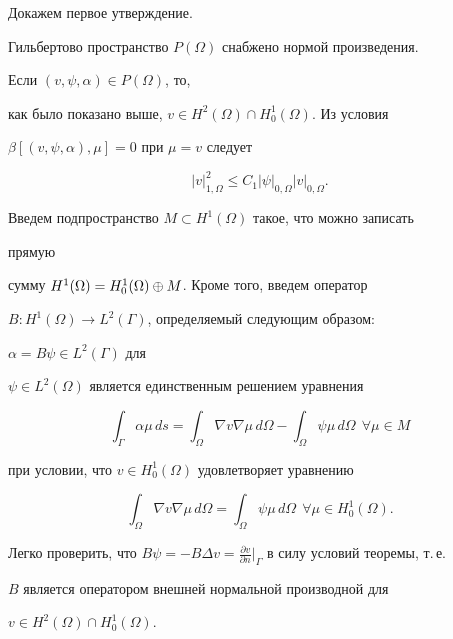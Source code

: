 Докажем первое утверждение. 


Гильбертово пространство $P(\Omega)$ снабжено нормой произведения. 


Если $(v,\psi,\alpha)\in P(\Omega)$, то, 


как было показано выше, $v\in H^2(\Omega)\cap H^1_0(\Omega)$. Из условия 


$\beta[(v,\psi,\alpha),\mu]=0$ при $\mu=v$ следует 


\begin{equation} 


|v|^2_{1,\Omega}\le C_1|\psi|_{0,\Omega}|v|_{0,\Omega}. 


\end{equation} 


Введем подпространство $M\subset H^1(\Omega)$ такое, что можно записать 


прямую 


сумму $H^1(\Omega)=\linebreak H^1_0(\Omega)\oplus M$. Кроме того, введем оператор 


$B:H^1(\Omega)\to L^2(\Gamma)$, определяемый следующим образом: 


$\alpha=B\psi\in L^2(\Gamma)$ для 


$\psi\in L^2(\Omega)$ является единственным решением уравнения 


\begin{equation} 


\int_\Gamma \alpha\mu\,ds=\int_\Omega \nabla v\nabla\mu\,d\Omega- 


\int_\Omega \psi\mu\,d\Omega\ \ \forall\mu\in M 


\end{equation} 


при условии, что $v\in H^1_0(\Omega)$ удовлетворяет уравнению 


$$ 


\int_\Omega \nabla v\nabla\mu\,d\Omega=\int_\Omega 


\psi\mu\,d\Omega\ \ \forall\mu\in H^1_0(\Omega). 


$$ 


Легко проверить, что $B\psi=-B\Delta v=\frac{\partial v}{\partial 


n}\big|_\Gamma$ в силу условий теоремы, т.\,е. 


$B$ является оператором внешней нормальной производной для 


$v\in H^2(\Omega)\cap H^1_0(\Omega)$. 


 


